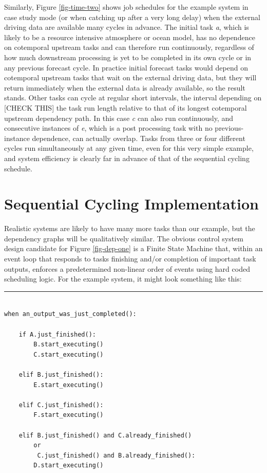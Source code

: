 \documentclass[11pt,a4paper]{article}
\begin{document}
Similarly, Figure \ref{fig-time-two} shows job schedules for the example
system in case study mode (or when catching up after a very long delay)
when the external driving data are available many cycles in advance. The
initial task {\em a}, which is likely to be a resource intensive
atmosphere or ocean model, has no dependence on cotemporal upstream
tasks and can therefore run continuously, regardless of how much
downstream processing is yet to be completed in its own cycle or in any
previous forecast cycle. In practice initial forecast tasks would depend
on cotemporal upstream tasks that wait on the external driving data, but
they will return immediately when the external data is already
available, so the result stands. Other tasks can cycle at regular short
intervals, the interval depending on [CHECK THIS] the task run length
relative to that of its longest cotemporal upstream dependency path. In
this case {\em c} can also run continuously, and consecutive instances
of {\em e}, which is a post processing task with no previous-instance
dependence, can actually overlap. Tasks from three or four different
cycles run simultaneously at any given time, even for this very simple
example, and system efficiency is clearly far in advance of that of the
sequential cycling schedule.  


\section{Sequential Cycling Implementation}

Realistic systems are likely to have many more tasks than our example,
but the dependency graphs will be qualitatively similar. The
obvious control system design candidate for Figure \ref{fig-dep-one}
is a Finite State Machine that, within an event loop that responds to 
tasks finishing and/or completion of important task outputs, enforces
a predetermined non-linear order of events using hard coded scheduling
logic.  For the example system, it might look something like this:

{\small
\noindent
\rule{5cm}{.2mm}
\begin{lstlisting} 

when an_output_was_just_completed():

    if A.just_finished():
        B.start_executing()
        C.start_executing()

    elif B.just_finished():
        E.start_executing()

    elif C.just_finished():
        F.start_executing()

    elif B.just_finished() and C.already_finished()
        or
         C.just_finished() and B.already_finished(): 
        D.start_executing()
\end{lstlisting}
}
\end{document}

